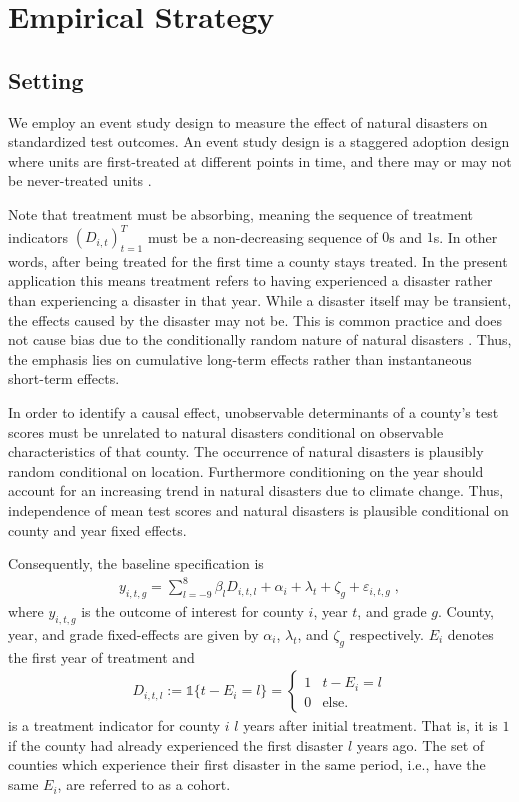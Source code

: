 
\section{Empirical Strategy} \label{EmpStrat}

\subsection{Setting}

We employ an event study design to measure the effect of natural disasters on standardized test outcomes. An event study design is a staggered adoption design where units are first-treated at different points in time, and there may or may not be never-treated units \citep{Sun_2021}.

Note that treatment must be absorbing, meaning the sequence of treatment indicators $(D_{i, t})_{t=1}^T$ must be a non-decreasing sequence of $0$s and $1$s. In other words, after being treated for the first time a county stays treated. In the present application this means treatment refers to having experienced a disaster rather than experiencing a disaster in that year. While a disaster itself may be transient, the effects caused by the disaster may not be. This is common practice and does not cause bias due to the conditionally random nature of natural disasters \citep{Deryugina_2017}. Thus, the emphasis lies on cumulative long-term effects rather than instantaneous short-term effects.

In order to identify a causal effect, unobservable determinants of a county's test scores must be unrelated to natural disasters conditional on observable characteristics of that county. The occurrence of natural disasters is plausibly random conditional on location. Furthermore conditioning on the year should account for an increasing trend in natural disasters due to climate change. Thus, independence of mean test scores and natural disasters is plausible conditional on county and year fixed effects.

Consequently, the baseline specification is
\begin{align} \label{baseline}
	y_{i, t, g} = \sum_{l = -9}^{8} \beta_l D_{i, t, l} + \alpha_i + \lambda_t + \zeta_g + \varepsilon_{i, t, g} \;,
\end{align}
where $y_{i, t, g}$ is the outcome of interest for county $i$, year $t$, and grade $g$. County, year, and grade fixed-effects are given by $\alpha_i$, $\lambda_t$, and $\zeta_g$ respectively. $E_i$ denotes the first year of treatment and \begin{align*}
	D_{i, t, l} := \mathds{1}\{t - E_i = l\} = \begin{cases}
		1 & t - E_i = l \\
		0 & \text{else.}
	\end{cases}
\end{align*} is a treatment indicator for county $i$ $l$ years after initial treatment. That is, it is $1$ if the county had already experienced the first disaster $l$ years ago. The set of counties which experience their first disaster in the same period, i.e., have the same $E_i$, are referred to as a cohort.

